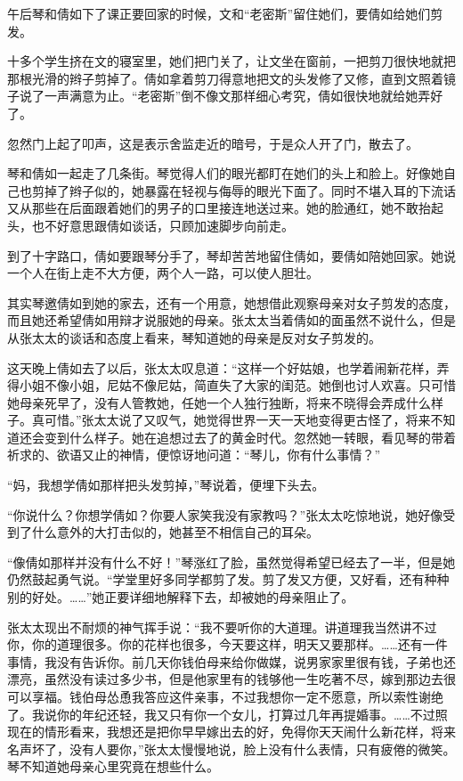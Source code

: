 \par 午后琴和倩如下了课正要回家的时候，文和“老密斯”留住她们，要倩如给她们剪发。
\par 十多个学生挤在文的寝室里，她们把门关了，让文坐在窗前，一把剪刀很快地就把那根光滑的辫子剪掉了。倩如拿着剪刀得意地把文的头发修了又修，直到文照着镜子说了一声满意为止。“老密斯”倒不像文那样细心考究，倩如很快地就给她弄好了。
\par 忽然门上起了叩声，这是表示舍监走近的暗号，于是众人开了门，散去了。
\par 琴和倩如一起走了几条街。琴觉得人们的眼光都盯在她们的头上和脸上。好像她自己也剪掉了辫子似的，她暴露在轻视与侮辱的眼光下面了。同时不堪入耳的下流话又从那些在后面跟着她们的男子的口里接连地送过来。她的脸通红，她不敢抬起头，也不好意思跟倩如谈话，只顾加速脚步向前走。
\par 到了十字路口，倩如要跟琴分手了，琴却苦苦地留住倩如，要倩如陪她回家。她说一个人在街上走不大方便，两个人一路，可以使人胆壮。
\par 其实琴邀倩如到她的家去，还有一个用意，她想借此观察母亲对女子剪发的态度，而且她还希望倩如用辩才说服她的母亲。张太太当着倩如的面虽然不说什么，但是从张太太的谈话和态度上看来，琴知道她的母亲是反对女子剪发的。
\par 这天晚上倩如去了以后，张太太叹息道：“这样一个好姑娘，也学着闹新花样，弄得小姐不像小姐，尼姑不像尼姑，简直失了大家的闺范。她倒也讨人欢喜。只可惜她母亲死早了，没有人管教她，任她一个人独行独断，将来不晓得会弄成什么样子。真可惜。”张太太说了又叹气，她觉得世界一天一天地变得更古怪了，将来不知道还会变到什么样子。她在追想过去了的黄金时代。忽然她一转眼，看见琴的带着祈求的、欲语又止的神情，便惊讶地问道：“琴儿，你有什么事情？”
\par “妈，我想学倩如那样把头发剪掉，”琴说着，便埋下头去。
\par “你说什么？你想学倩如？你要人家笑我没有家教吗？”张太太吃惊地说，她好像受到了什么意外的大打击似的，她甚至不相信自己的耳朵。
\par “像倩如那样并没有什么不好！”琴涨红了脸，虽然觉得希望已经去了一半，但是她仍然鼓起勇气说。“学堂里好多同学都剪了发。剪了发又方便，又好看，还有种种别的好处。……”她正要详细地解释下去，却被她的母亲阻止了。
\par 张太太现出不耐烦的神气挥手说：“我不要听你的大道理。讲道理我当然讲不过你，你的道理很多。你的花样也很多，今天要这样，明天又要那样。……还有一件事情，我没有告诉你。前几天你钱伯母来给你做媒，说男家家里很有钱，子弟也还漂亮，虽然没有读过多少书，但是他家里有的钱够他一生吃著不尽，嫁到那边去很可以享福。钱伯母怂恿我答应这件亲事，不过我想你一定不愿意，所以索性谢绝了。我说你的年纪还轻，我又只有你一个女儿，打算过几年再提婚事。……不过照现在的情形看来，我想还是把你早早嫁出去的好，免得你天天闹什么新花样，将来名声坏了，没有人要你，”张太太慢慢地说，脸上没有什么表情，只有疲倦的微笑。琴不知道她母亲心里究竟在想些什么。
